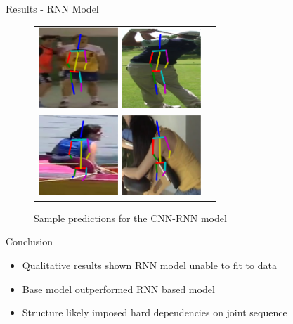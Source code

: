 \documentclass[10pt]{beamer}
\begin{document}
\begin{frame}{Results - RNN Model}
\begin{figure}
\begin{tabular}{cc}
\includegraphics[width=30mm]{../images/rnn_1}
\includegraphics[width=30mm]{../images/rnn_2}\\
\includegraphics[width=30mm]{../images/rnn_3}
\includegraphics[width=30mm]{../images/rnn_4}\\
\end{tabular}
\caption{Sample predictions for the CNN-RNN model}
\label{fig:rnn_images}
\end{figure}
\end{frame}

\begin{frame}{Conclusion}

\begin{itemize}
\item Qualitative results shown RNN model unable to fit to data
\item Base model outperformed RNN based model
\item Structure likely imposed hard dependencies on joint sequence
\end{itemize}
\end{frame}

\end{document}
